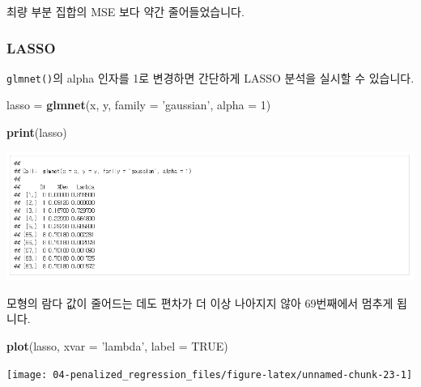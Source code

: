\documentclass[12pt,]{book}
\newenvironment{Shaded}{\begin{snugshade}}{\end{snugshade}}
\newcommand{\DataTypeTok}[1]{\textcolor[rgb]{0.13,0.29,0.53}{#1}}
\newcommand{\DecValTok}[1]{\textcolor[rgb]{0.00,0.00,0.81}{#1}}
\newcommand{\KeywordTok}[1]{\textcolor[rgb]{0.13,0.29,0.53}{\textbf{#1}}}
\newcommand{\NormalTok}[1]{#1}
\newcommand{\OtherTok}[1]{\textcolor[rgb]{0.56,0.35,0.01}{#1}}
\newcommand{\StringTok}[1]{\textcolor[rgb]{0.31,0.60,0.02}{#1}}
\begin{document}
최량 부분 집합의 MSE 보다 약간 줄어들었습니다.

\hypertarget{lasso}{%
\subsubsection{LASSO}\label{lasso}}

\texttt{glmnet()}의 alpha 인자를 1로 변경하면 간단하게 LASSO 분석을 실시할 수 있습니다.

\begin{Shaded}
\begin{Highlighting}[]
\NormalTok{lasso =}\StringTok{ }\KeywordTok{glmnet}\NormalTok{(x, y, }\DataTypeTok{family =} \StringTok{'gaussian'}\NormalTok{, }\DataTypeTok{alpha =} \DecValTok{1}\NormalTok{)}
\end{Highlighting}
\end{Shaded}

\begin{Shaded}
\begin{Highlighting}[]
\KeywordTok{print}\NormalTok{(lasso)}
\end{Highlighting}
\end{Shaded}

\begin{center}\includegraphics[width=1\linewidth]{images/lasso} \end{center}

모형의 람다 값이 줄어드는 데도 편차가 더 이상 나아지지 않아 69번째에서 멈추게 됩니다.

\begin{Shaded}
\begin{Highlighting}[]
\KeywordTok{plot}\NormalTok{(lasso, }\DataTypeTok{xvar =} \StringTok{'lambda'}\NormalTok{, }\DataTypeTok{label =} \OtherTok{TRUE}\NormalTok{)}
\end{Highlighting}
\end{Shaded}

\begin{center}\texttt{[image: 04-penalized\_regression\_files/figure-latex/unnamed-chunk-23-1]} \end{center}
\end{document}
